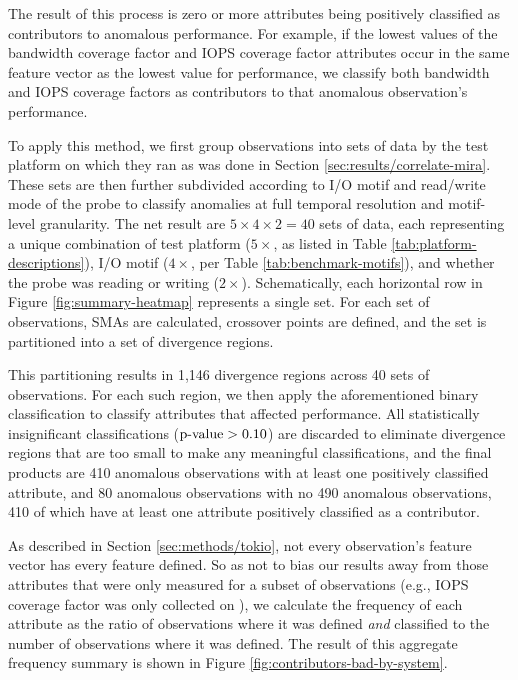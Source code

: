 The result of this process is zero or more attributes being positively classified as contributors to anomalous performance.
For example, if the lowest values of the bandwidth coverage factor and IOPS coverage factor attributes occur in the same feature vector as the lowest value for performance, we classify both bandwidth and IOPS coverage factors as contributors to that anomalous observation's performance.

To apply this method, we first group observations into sets of data by the test platform on which they ran as was done in Section \ref{sec:results/correlate-mira}.
These sets are then further subdivided according to I/O motif and read/write mode of the probe to classify anomalies at full temporal resolution and motif-level granularity.
The net result are $5 \times 4 \times 2 = 40$ sets of data, each representing a unique combination of test platform ($5 \times$, as listed in Table \ref{tab:platform-descriptions}), I/O motif ($4 \times$, per Table \ref{tab:benchmark-motifs}), and whether the probe was reading or writing ($2 \times$).
Schematically, each horizontal row in Figure \ref{fig:summary-heatmap} represents a single set.
For each set of observations, SMAs are calculated, crossover points are defined, and the set is partitioned into a set of divergence regions.

This partitioning results in 1,146 divergence regions across 40 sets of observations.
For each such region, we then apply the aforementioned binary classification to classify attributes that affected performance.
All statistically insignificant classifications ($\textup{p-value} > 0.10$) are discarded to eliminate divergence regions that are too small to make any meaningful classifications, and the final products are 
410 anomalous observations with at least one positively classified attribute, and 80 anomalous observations with no 
490 anomalous observations, 410 of which have at least one attribute positively classified as a contributor.

As described in Section \ref{sec:methods/tokio}, not every observation's feature vector has every feature defined.
So as not to bias our results away from those attributes that were only measured for a subset of observations (e.g., IOPS coverage factor was only collected on \mira), we calculate the frequency of each attribute as the ratio of observations where it was defined \emph{and} classified to the number of observations where it was defined.
The result of this aggregate frequency summary is shown in Figure \ref{fig:contributors-bad-by-system}.

